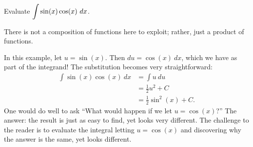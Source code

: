 \begin{example} \label{eg:4.6.usub3} 
Evaluate $\displaystyle \int \sin(x) \cos(x) \ dx$.

\solution
There is not a composition of functions here to exploit; rather, just a product of functions. 

In this example, let $u = \sin(x)$. Then $du = \cos(x) \ dx$, which we have as part of the integrand! The substitution becomes very straightforward:
\begin{align*}
\int \sin(x) \cos(x) \ dx & = \int u \ du \\
&= \frac{1}{2}u^2+ C \\
&= \frac{1}{2} \sin^2(x) + C.
\end{align*}
One would do well to ask ``What would happen if we let $u = \cos(x)$?'' The answer: the result is just as easy to find, yet looks very different. The challenge to the reader is to evaluate the integral letting $u = \cos(x)$ and discovering why the answer is the same, yet looks different.
\end{example}